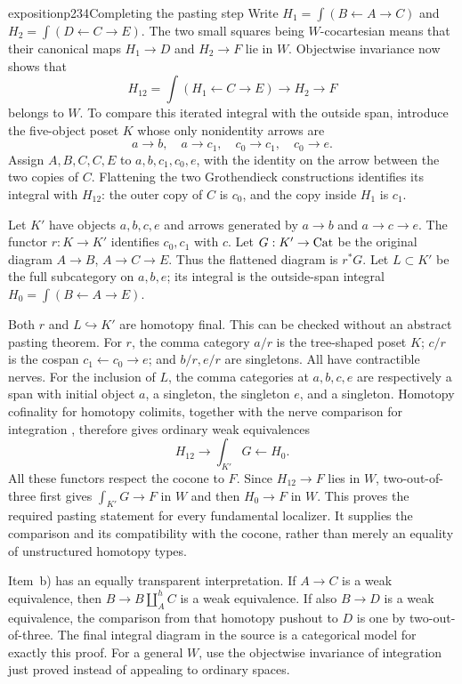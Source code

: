 \begin{dcomment}{exposition}{p234}{Completing the pasting step}
Write $H_1=\int(B\leftarrow A\to C)$ and $H_2=\int(D\leftarrow C\to E)$. The two small squares being $W$-cocartesian means that their canonical maps $H_1\to D$ and $H_2\to F$ lie in $W$. Objectwise invariance now shows that
\[
 H_{12}=\int(H_1\leftarrow C\to E)\longrightarrow H_2\longrightarrow F
\]
belongs to $W$. To compare this iterated integral with the outside span, introduce the five-object poset $K$ whose only nonidentity arrows are
\[
 a\to b,\quad a\to c_1,\quad c_0\to c_1,\quad c_0\to e.
\]
Assign $A,B,C,C,E$ to $a,b,c_1,c_0,e$, with the identity on the arrow between the two copies of $C$. Flattening the two Grothendieck constructions identifies its integral with $H_{12}$: the outer copy of $C$ is $c_0$, and the copy inside $H_1$ is $c_1$.

Let $K'$ have objects $a,b,c,e$ and arrows generated by $a\to b$ and $a\to c\to e$. The functor $r:K\to K'$ identifies $c_0,c_1$ with $c$. Let $G:K'\to\mathrm{Cat}$ be the original diagram $A\to B$, $A\to C\to E$. Thus the flattened diagram is $r^*G$. Let $L\subset K'$ be the full subcategory on $a,b,e$; its integral is the outside-span integral $H_0=\int(B\leftarrow A\to E)$.

Both $r$ and $L\hookrightarrow K'$ are homotopy final. This can be checked without an abstract pasting theorem. For $r$, the comma category $a/r$ is the tree-shaped poset $K$; $c/r$ is the cospan $c_1\leftarrow c_0\to e$; and $b/r,e/r$ are singletons. All have contractible nerves. For the inclusion of $L$, the comma categories at $a,b,c,e$ are respectively a span with initial object $a$, a singleton, the singleton $e$, and a singleton. Homotopy cofinality for homotopy colimits, together with the nerve comparison for integration \citep[Theorem 1.2]{Thomason1979}, therefore gives ordinary weak equivalences
\[
 H_{12}\longrightarrow \int_{K'}G\longleftarrow H_0.
\]
All these functors respect the cocone to $F$. Since $H_{12}\to F$ lies in $W$, two-out-of-three first gives $\int_{K'}G\to F$ in $W$ and then $H_0\to F$ in $W$. This proves the required pasting statement for every fundamental localizer. It supplies the comparison and its compatibility with the cocone, rather than merely an equality of unstructured homotopy types.

Item~b) has an equally transparent interpretation. If $A\to C$ is a weak equivalence, then $B\to B\amalg_A^hC$ is a weak equivalence. If also $B\to D$ is a weak equivalence, the comparison from that homotopy pushout to $D$ is one by two-out-of-three. The final integral diagram in the source is a categorical model for exactly this proof. For a general $W$, use the objectwise invariance of integration just proved instead of appealing to ordinary spaces.


\end{dcomment}
